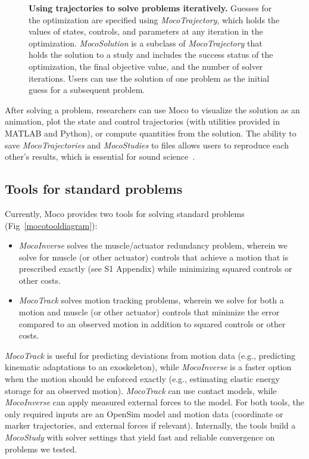 \documentclass[10pt,letterpaper]{article}
\begin{document}
\begin{figure}[!h]
    \centering
    \caption{{\bf Using trajectories to solve problems iteratively.}
        Guesses for the optimization are specified using \textit{MocoTrajectory}, which holds the values of states, controls, and parameters at any iteration in the optimization. \textit{MocoSolution} is a subclass of \textit{MocoTrajectory} that holds the solution to a study and includes the success status of the optimization, the final objective value, and the number of solver iterations. Users can use the solution of one problem as the initial guess for a subsequent problem.}
    \label{mocosolverdiagram}
\end{figure}

After solving a problem, researchers can use Moco to visualize the solution as an animation, plot the state and control trajectories (with utilities provided in MATLAB and Python), or compute quantities from the solution. The ability to save \textit{MocoTrajectories} and \textit{MocoStudies} to files allows users to reproduce each other's results, which is essential for sound science~\cite{Peng:2011}.

\subsection*{Tools for standard problems}

Currently, Moco provides two tools for solving standard problems (Fig~\ref{mocotooldiagram}):
\begin{itemize}
\item \textit{MocoInverse} solves the muscle/actuator redundancy problem, wherein we solve for muscle (or other actuator) controls that achieve a motion that is prescribed exactly (see S1 Appendix) while minimizing squared controls or other costs.
\item \textit{MocoTrack} solves motion tracking problems, wherein we solve for both a motion and muscle (or other actuator) controls that minimize the error compared to an observed motion in addition to squared controls or other costs.
\end{itemize}
\textit{MocoTrack} is useful for predicting deviations from motion data (e.g., predicting kinematic adaptations to an exoskeleton), while \textit{MocoInverse} is a faster option when the motion should be enforced exactly (e.g., estimating elastic energy storage for an observed motion). \textit{MocoTrack} can use contact models, while \textit{MocoInverse} can apply measured external forces to the model. For both tools, the only required inputs are an OpenSim model and motion data (coordinate or marker trajectories, and external forces if relevant). Internally, the tools build a \textit{MocoStudy} with solver settings that yield fast and reliable convergence on problems we tested.
\end{document}
